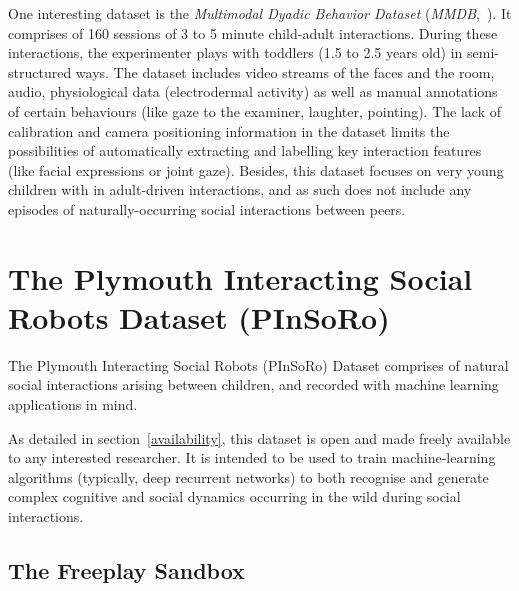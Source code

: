 \documentclass{article}
\begin{document}
One interesting dataset is the \emph{Multimodal Dyadic Behavior
Dataset} (\emph{MMDB},~\cite{rehg2013decoding}). It comprises of 160 sessions of
3 to 5 minute child-adult interactions. During these interactions, the
experimenter plays with toddlers (1.5 to 2.5 years old) in semi-structured ways.
The dataset includes video streams of the faces and the room, audio, physiological data
(electrodermal activity) as well as manual annotations of certain behaviours
(like gaze to the examiner, laughter, pointing). The lack of calibration and camera positioning
information in the dataset limits the possibilities of automatically extracting and
labelling key interaction features (like facial expressions or joint gaze). Besides,
this dataset focuses on very young children with in adult-driven interactions,
and as such does not include any episodes of naturally-occurring social
interactions between peers.


\section{The Plymouth Interacting Social Robots Dataset (PInSoRo)}


The Plymouth Interacting Social Robots (PInSoRo) Dataset comprises of natural
social interactions arising between children, and recorded with machine learning
applications in mind.

As detailed in section~\ref{availability}, this dataset is open and made freely
available to any interested researcher. It is intended to be used to train
machine-learning algorithms (typically, deep recurrent networks) to both
recognise and generate complex cognitive and social dynamics occurring in the
wild during social interactions.

\subsection{The Freeplay Sandbox}
\end{document}

